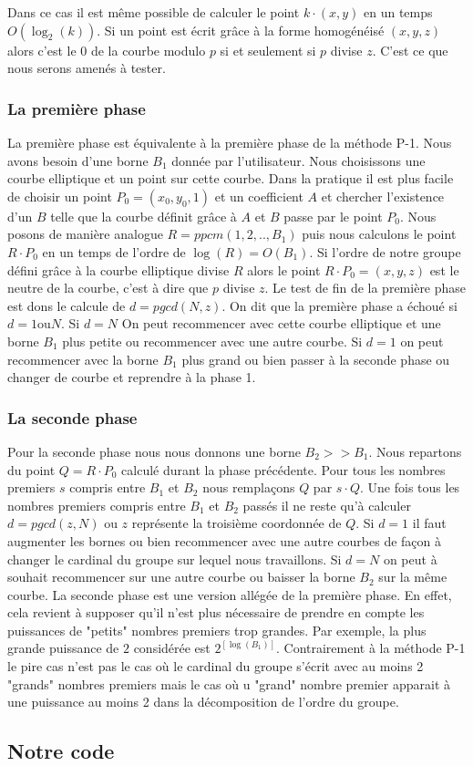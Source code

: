 \documentclass[10pt,a4paper]{report}
\begin{document}
Dans ce cas il est même possible de calculer  le point  $k \cdot(x,y)$  en un temps  $O(\log_2(k))$. Si un point est écrit grâce à la forme homogénéisé $(x,y,z)$ alors c'est le $0$ de la courbe modulo $p$ si et seulement si $p$ divise $z$. C'est ce que nous serons amenés à tester.

	
\subsubsection{La première phase}

	La première phase est équivalente à la première phase de la méthode P-1. Nous avons besoin d'une borne $B_1$ donnée par l'utilisateur. Nous choisissons une courbe elliptique et un point sur cette courbe. Dans la pratique il est plus facile de choisir un point $P_0 =(x_0,y_0,1)$ et un coefficient $A$ et chercher l'existence d'un $B$ telle que la courbe définit grâce à $A$ et $B$ passe par le point $P_0$. Nous posons de manière analogue $R = ppcm (1,2,..,B_1)$ puis nous calculons le point $R \cdot P_0 $ en un temps de l'ordre de $\log(R)= O(B_1)$. Si l'ordre de notre groupe défini grâce à la courbe elliptique divise $R$ alors le point $R \cdot P_0 = (x,y,z) $ est le neutre de la courbe, c'est à dire que $p$ divise $z$. Le test de fin de la première phase est dons le calcule de $d = pgcd (N,z)$. On dit que la première phase a échoué si $d = 1 $ou$ N $. Si $d = N$ On peut recommencer avec cette courbe elliptique et une borne $B_1$ plus petite ou recommencer avec une autre courbe. Si $d=1$ on peut recommencer avec la borne $B_1$ plus grand ou bien passer à la seconde phase ou changer de courbe et reprendre à la phase 1. 


\subsubsection{La seconde phase}
	
Pour la seconde phase nous nous donnons une borne $B_2 >> B_1$. Nous repartons du point $Q = R \cdot P_0$ calculé durant la phase précédente. Pour tous les nombres premiers $s$ compris entre $B_1$ et $B_2$ nous remplaçons $Q$ par $ s \cdot Q$. Une fois tous les nombres premiers compris entre $B_1$ et $B_2$ passés il ne reste qu'à calculer $d = pgcd(z,N)$ ou $z$ représente la troisième coordonnée de $Q$. Si $d = 1$ il faut augmenter les bornes ou bien recommencer avec une autre courbes de façon à changer le cardinal du groupe sur lequel nous travaillons. Si $d = N$ on peut à souhait recommencer sur une autre courbe ou baisser la borne $B_2$ sur la même courbe. La seconde phase est une version allégée de la première phase. En effet, cela revient à supposer qu'il n'est plus nécessaire de prendre en compte les puissances de "petits" nombres premiers trop grandes. Par exemple, la plus grande puissance de $2$ considérée est $2^{[\log(B_1)]}$. Contrairement à la méthode P-1 le pire cas n'est pas le cas où le cardinal du groupe s'écrit avec au moins 2 "grands" nombres premiers mais le cas où u "grand" nombre premier apparait à une puissance au moins 2 dans la décomposition de l'ordre du groupe. 

	
	
\subsection{Notre code}
\end{document}
